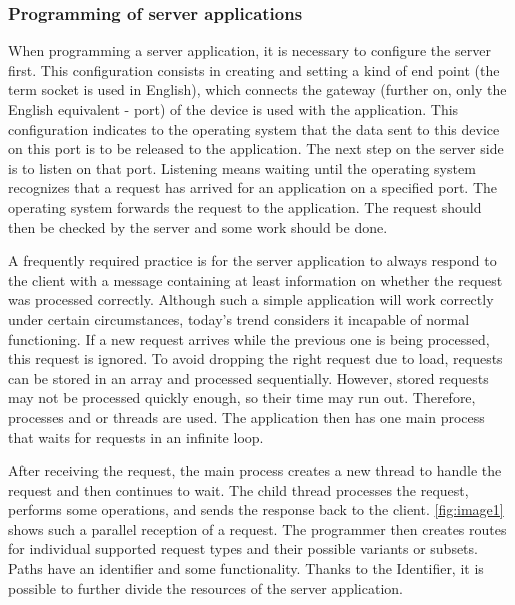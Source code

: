 \documentclass[
  language=english,
  figures=false,
  sourcecodes,
  index
]{kidiplom}
\begin{document}
\subsubsection{Programming of server applications}
When programming a server application, it is necessary to configure the server first. This configuration consists in creating and setting a kind of end point (the term socket is used in English), which connects the gateway (further on, only the English equivalent - port) of the device is used with the application. This configuration indicates to the operating system that the data sent to this device on this port is to be released to the application. The next step on the server side is to listen on that port. Listening means waiting until the operating system recognizes that a request has arrived for an application on a specified port. The operating system forwards the request to the application. The request should then be checked by the server and some work should be done. 

A frequently required practice is for the server application to always respond to the client with a message containing at least information on whether the request was processed correctly.
Although such a simple application will work correctly under certain circumstances, today's trend considers it incapable of normal functioning. If a new request arrives while the previous one is being processed, this request is ignored. To avoid dropping the right request due to load, requests can be stored in an array and processed sequentially. However, stored requests may not be processed quickly enough, so their time may run out. Therefore, processes and or threads are used. The application then has one main process that waits for requests in an infinite loop.


After receiving the request, the main process creates a new thread to handle the request and then continues to wait. The child thread processes the request, performs some operations, and sends the response back to the client. \ref{fig:image1} shows such a parallel reception of a request. The programmer then creates routes for individual supported request types and their possible variants or subsets. Paths have an identifier and some functionality. Thanks to the Identifier, it is possible to further divide the resources of the server application.
\end{document}
